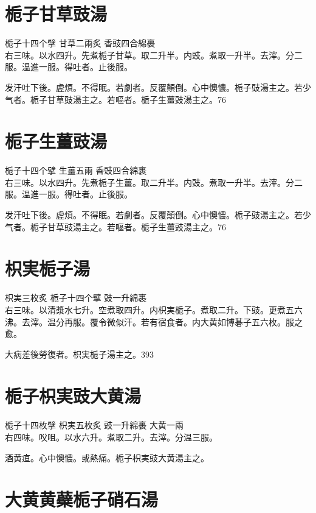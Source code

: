 \section{栀子甘草豉湯}

栀子{\scriptsize 十四个擘} 甘草{\scriptsize 二兩炙} 香豉{\scriptsize 四合綿裹}\\
右三味。以水四升。先煮栀子甘草。取二升半。内豉。煮取一升半。去滓。分二服。温進一服。得吐者。止後服。

发汗吐下後。虗煩。不得眠。若劇者。反覆顛倒。心中懊憹。栀子{\khaai 豉}湯主之。若少气者。栀子甘草{\khaai 豉}湯主之。若嘔者。栀子生薑{\khaai 豉}湯主之。76

\section{栀子生薑豉湯}

栀子{\scriptsize 十四个擘} 生薑{\scriptsize 五兩} 香豉{\scriptsize 四合綿裹}\\
右三味。以水四升。先煮栀子生薑。取二升半。内豉。煮取一升半。去滓。分二服。温進一服。得吐者。止後服。

发汗吐下後。虗煩。不得眠。若劇者。反覆顛倒。心中懊憹。栀子{\khaai 豉}湯主之。若少气者。栀子甘草{\khaai 豉}湯主之。若嘔者。栀子生薑{\khaai 豉}湯主之。76

\section{枳実栀子湯}

枳実{\scriptsize 三枚炙} 栀子{\scriptsize 十四个擘} 豉{\scriptsize 一升綿裹}\\
右三味。以清漿水七升。空煮取四升。内枳実栀子。煮取二升。下豉。更煮五六沸。去滓。温分再服。覆令微似汗。若有宿食者。内大黄如博碁子五六枚。服之愈。

大病差後勞復者。枳実栀子湯主之。393

\section{栀子枳実豉大黄湯}

栀子{\scriptsize 十四枚擘} 枳実{\scriptsize 五枚炙} 豉{\scriptsize 一升綿裹} 大黄{\scriptsize 一兩}\\
右四味。㕮咀。以水六升。煮取二升。去滓。分温三服。

酒黄疸。心中懊憹。或熱痛。栀子{\khaai 枳実豉}大黄湯主之。

\section{大黄黄蘗栀子硝石湯}

